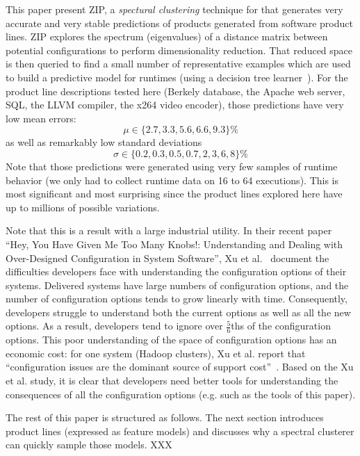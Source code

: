 \documentclass{sig-alternative}
\begin{document}
This paper present ZIP, a {\em spectural clustering}  technique for  that generates very
accurate and very stable predictions of products generated from software product lines.
ZIP explores the spectrum (eigenvalues) of a distance matrix
between potential configurations to perform dimensionality reduction. That reduced
space is then queried to find a small number of representative examples which are used to
build a predictive model for runtimes (using a decision tree learner~\cite{breiman1984}).
For the product line descriptions tested here (Berkely database, the Apache web server, SQL, the LLVM compiler, the x264 video encoder),
those predictions have very low mean errors:
\[\mu \in \{2.7, 3.3, 5.6, 6.6, 9.3\}\%\]
as well as remarkably low  standard deviations
\[\sigma \in \{0.2, 0.3, 0.5,0.7,2,3,6,8\}\%\]
Note that those predictions were generated using   very few samples of runtime behavior
(we only had to collect runtime data on 16 to 64 executions).
This is most significant and most surprising  since the product lines explored here have up
to millions of possible variations. 

Note that this is a result with a large industrial utility.
In their recent paper ``Hey, You Have Given Me Too Many Knobs!: Understanding and Dealing with Over-Designed Configuration in System Software'', Xu et al.~\cite{xu2015hey} document the  difficulties developers face
with understanding  the configuration options of their systems.
Delivered systems have large numbers of configuration options, and the number of  configuration options tends to grow linearly
with time. Consequently, developers  struggle to understand both the current options as well as all the new options.
As a result, developers tend to ignore over $\frac{5}{6}$ths of the configuration options. 
This poor understanding of the space of configuration options has an economic cost:  for one system (Hadoop clusters),  Xu et al. report that ``configuration
issues are the dominant source of support cost''~\cite{xu2015hey}. 
Based on the Xu et al. study, it is clear that developers need better tools for understanding the 
consequences of all the configuration options (e.g. such as   the tools of this paper).



The rest of this paper is structured as follows. The next section introduces
product lines (expressed as feature models) and discusses why a spectral clusterer can
quickly sample those models. XXX 
\end{document}
